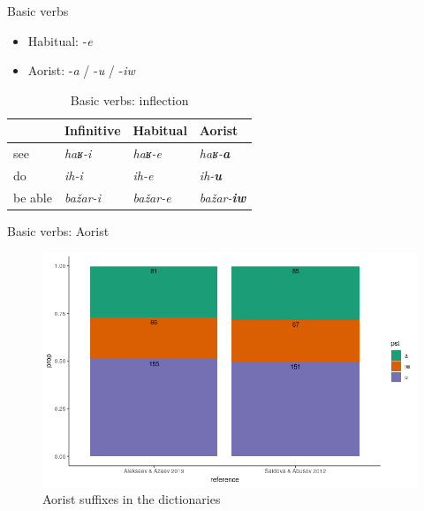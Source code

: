 \begin{frame}{Basic verbs}
\begin{itemize}
    \item Habitual: -\textit{e}
    \item Aorist: -\textit{a} / -\textit{u} / -\textit{iw}
\end{itemize}
\begin{table}[]
\centering
\caption{Basic verbs: inflection}
\begin{tabular}{l|l|l|l}
        & Infinitive       & Habitual       & Aorist            \\ \hline
see     & \textit{haʁ-i}   & \textit{haʁ-e}   & \textit{haʁ-\textbf{a}}    \\
do      & \textit{ih-i}    & \textit{ih-e}    & \textit{ih-\textbf{u}}     \\
be able & \textit{bažar-i} & \textit{bažar-e} & \textit{bažar-\textbf{iw}}
\end{tabular}
\end{table}
\end{frame}

\begin{frame}{Basic verbs: Aorist}

\begin{figure}[h]
\centering
\caption{Aorist suffixes in the dictionaries}
\includegraphics[scale=0.5]{images/pst.png}
\end{figure}

\end{frame}

